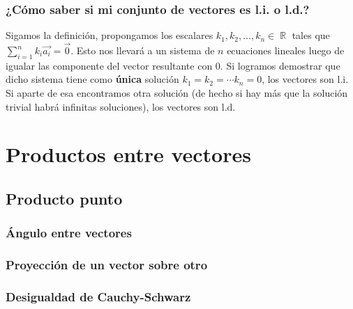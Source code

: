 \documentclass[12pt, fleqn]{report}                             %
\DeclareMathOperator \Reals        {\mathbb{R}}                 %
\begin{document}
            \subsubsection{¿Cómo saber si mi conjunto de vectores es l.i. o l.d.?}
            
            Sigamos la definición, propongamos los escalares $k_1, k_2, \ldots, k_n \in \Reals$ tales que $\displaystyle \sum_{i=1}^{n} k_i \vec{a_i} = \vec{0}$. Esto nos llevará a un sistema de $n$ ecuaciones lineales luego de igualar las componente del vector resultante con 0. Si logramos demostrar que dicho sistema tiene como \textbf{única} solución $k_1 = k_2 = \cdots k_n = 0$, los vectores son l.i. Si aparte de esa encontramos otra solución (de hecho si hay más que la solución trivial habrá infinitas soluciones), los vectores son l.d.
        



















        \section{Productos entre vectores}
        
            \subsection{Producto punto}
            
                \subsubsection{Ángulo entre vectores}
                
                \subsubsection{Proyección de un vector sobre otro}
                
                \subsubsection{Desigualdad de Cauchy-Schwarz}
                
\end{document}
